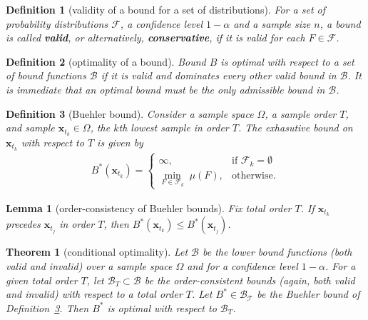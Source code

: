 \documentclass[10pt,a4paper]{amsart}
\newtheorem{definition}{Definition}
\newtheorem{lemma}{Lemma}
\newtheorem{theorem}{Theorem}
\def\x{\mathbf{x}}
\begin{document}
\begin{definition}[validity of a bound for a set of distributions]
\label{def:validity_for_dists}
For a set of probability distributions $\mathcal{F}$, a confidence level $1-\alpha$ and a sample size $n$, a bound is called {\bf valid}, or alternatively, {\bf conservative}, if  it is valid for each  $F\in\mathcal{F}$. 
\end{definition}

\begin{definition}[optimality of a bound]
\label{def:opt}
    Bound $B$ is \emph{optimal} with respect to  a set of bound functions $\mathcal{B}$ if it is valid and dominates every other valid bound in $\mathcal{B}$. It is immediate that an optimal bound must be the only admissible bound in $\mathcal{B}$. 
\end{definition}

\begin{definition}[Buehler bound]
\label{def:cop}
    Consider a sample space $\Omega$, a sample order $T$, and sample $\x_{t_k} \in \Omega$, the $k$th lowest sample in order $T$. The \emph{exhasutive bound} on $\x_{t_k}$ with respect to $T$ is given by
    \begin{eqnarray}
    \label{eq:optBound}
    B^*(\x_{t_k}) =
    \begin{cases}
        \infty,& \text{if } \mathcal{F}_k=\emptyset \\
        \underset{F\in \mathcal{F}_k}{\min} \;\mu(F),              & \text{otherwise.}
    \end{cases}
    \end{eqnarray}
\end{definition}

\begin{lemma}[order-consistency of Buehler bounds]
\label{lemma:incremental_sums}
Fix total order $T$. If $\x_{t_k}$ precedes $\x_{t_j}$ in order $T$, then $B^*(\x_{t_k}) \leq B^*(\x_{t_j})$. 
\end{lemma}

\begin{theorem}[conditional optimality]
\label{thm:conditional_optimality}
Let $\mathcal{B}$ be the lower bound functions (both valid and invalid) over a sample space $\Omega$ and for a confidence level $1-\alpha$. For a given total order $T$, let $\mathcal{B}_T\subset \mathcal{B}$ be the order-consistent bounds (again, both valid and invalid) with respect to a total order $T$. Let $B^*\in \mathcal{B_T}$ be the Buehler bound of Definition~\ref{def:cop}. Then $B^*$ is optimal with respect to $\mathcal{B}_T$. 
\end{theorem}
\end{document}
